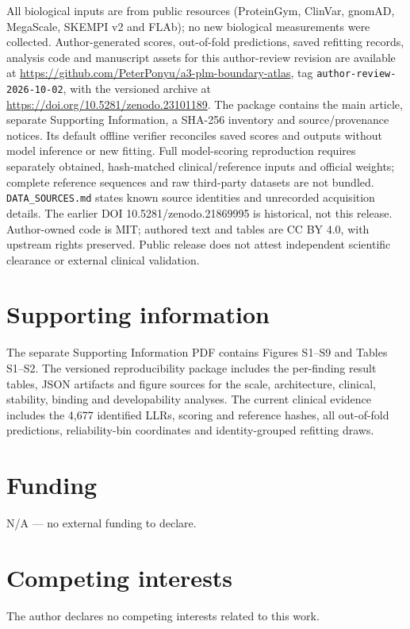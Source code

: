 \documentclass[12pt]{article}
\begin{document}
All biological inputs are from public resources (ProteinGym, ClinVar, gnomAD, MegaScale, SKEMPI v2 and FLAb); no new biological measurements were collected. Author-generated scores, out-of-fold predictions, saved refitting records, analysis code and manuscript assets for this author-review revision are available at \url{https://github.com/PeterPonyu/a3-plm-boundary-atlas}, tag \texttt{author-review-2026-10-02}, with the versioned archive at \url{https://doi.org/10.5281/zenodo.23101189}. The package contains the main article, separate Supporting Information, a SHA-256 inventory and source/provenance notices. Its default offline verifier reconciles saved scores and outputs without model inference or new fitting. Full model-scoring reproduction requires separately obtained, hash-matched clinical/reference inputs and official weights; complete reference sequences and raw third-party datasets are not bundled. \texttt{DATA\_SOURCES.md} states known source identities and unrecorded acquisition details. The earlier DOI 10.5281/zenodo.21869995 is historical, not this release. Author-owned code is MIT; authored text and tables are CC BY 4.0, with upstream rights preserved. Public release does not attest independent scientific clearance or external clinical validation.



\section*{Supporting information}

The separate Supporting Information PDF contains Figures S1--S9 and Tables S1--S2. The versioned reproducibility package includes the per-finding result tables, JSON artifacts and figure sources for the scale, architecture, clinical, stability, binding and developability analyses. The current clinical evidence includes the 4,677 identified LLRs, scoring and reference hashes, all out-of-fold predictions, reliability-bin coordinates and identity-grouped refitting draws.

\section*{Funding}
N/A --- no external funding to declare.

\section*{Competing interests}
The author declares no competing interests related to this work.
\end{document}
